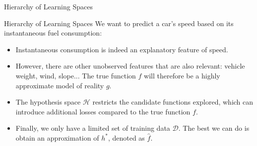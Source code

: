 \begin{frame}[fragile]{Hierarchy of Learning Spaces}
	\hspace*{+1.0cm}
\end{frame}

\begin{frame}{Hierarchy of Learning Spaces}
	We want to predict a car's speed based on its instantaneous fuel consumption:
	\pause
	\begin{itemize}
		\item Instantaneous consumption is indeed an explanatory feature of speed.
		\pause
		\item However, there are other unobserved features that are also relevant: vehicle weight, wind, slope... The true function $f$ will therefore be a highly approximate model of reality $g$.
		\pause
		\item The hypothesis space $\mathcal{H}$ restricts the candidate functions explored, which can introduce additional losses compared to the true function $f$.
		\pause
		\item Finally, we only have a limited set of training data $\mathcal{D}$. The best we can do is obtain an approximation of $h^{*}$, denoted as $\hat{f}$.
	\end{itemize}
\end{frame}

